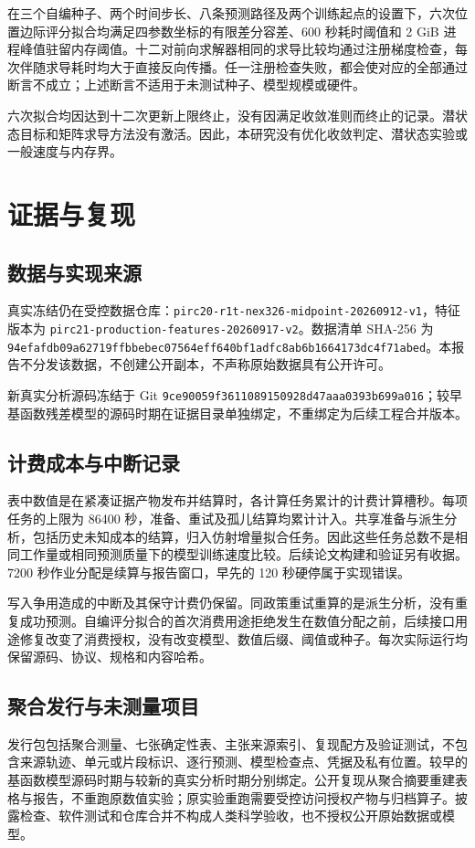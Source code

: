 \documentclass[UTF8,11pt]{ctexart}
\newcommand{\tabfile}[1]{\begin{center}\resizebox{\textwidth}{!}{}\end{center}}
\begin{document}
在三个自编种子、两个时间步长、八条预测路径及两个训练起点的设置下，六次位置边际评分拟合均满足四参数坐标的有限差分容差、600 秒耗时阈值和 2 GiB 进程峰值驻留内存阈值。十二对前向求解器相同的求导比较均通过注册梯度检查，每次伴随求导耗时均大于直接反向传播。任一注册检查失败，都会使对应的全部通过断言不成立；上述断言不适用于未测试种子、模型规模或硬件。

六次拟合均因达到十二次更新上限终止，没有因满足收敛准则而终止的记录。潜状态目标和矩阵求导方法没有激活。因此，本研究没有优化收敛判定、潜状态实验或一般速度与内存界。

\appendix
\section{证据与复现}\label{sec:appendix}
\subsection{数据与实现来源}\label{sec:provenance}
真实冻结仍在受控数据仓库：\nolinkurl{pirc20-r1t-nex326-midpoint-20260912-v1}，特征版本为 \nolinkurl{pirc21-production-features-20260917-v2}。数据清单 SHA-256 为 \nolinkurl{94efafdb09a62719ffbbebec07564eff640bf1adfc8ab6b1664173dc4f71abed}。本报告不分发该数据，不创建公开副本，不声称原始数据具有公开许可。

新真实分析源码冻结于 Git \nolinkurl{9ce90059f3611089150928d47aaa0393b699a016}；较早基函数残差模型的源码时期在证据目录单独绑定，不重绑定为后续工程合并版本。

\subsection{计费成本与中断记录}\label{sec:repro}
\tabfile{costs.tex}
表中数值是在紧凑证据产物发布并结算时，各计算任务累计的计费计算槽秒。每项任务的上限为 86400 秒，准备、重试及孤儿结算均累计计入。共享准备与派生分析，包括历史未知成本的结算，归入仿射增量拟合任务。因此这些任务总数不是相同工作量或相同预测质量下的模型训练速度比较。后续论文构建和验证另有收据。7200 秒作业分配是续算与报告窗口，早先的 120 秒硬停属于实现错误。

写入争用造成的中断及其保守计费仍保留。同政策重试重算的是派生分析，没有重复成功预测。自编评分拟合的首次消费用途拒绝发生在数值分配之前，后续接口用途修复改变了消费授权，没有改变模型、数值后缀、阈值或种子。每次实际运行均保留源码、协议、规格和内容哈希。

\subsection{聚合发行与未测量项目}
发行包包括聚合测量、七张确定性表、主张来源索引、复现配方及验证测试，不包含来源轨迹、单元或片段标识、逐行预测、模型检查点、凭据及私有位置。较早的基函数模型源码时期与较新的真实分析时期分别绑定。公开复现从聚合摘要重建表格与报告，不重跑原数值实验；原实验重跑需要受控访问授权产物与归档算子。披露检查、软件测试和仓库合并不构成人类科学验收，也不授权公开原始数据或模型。
\end{document}
